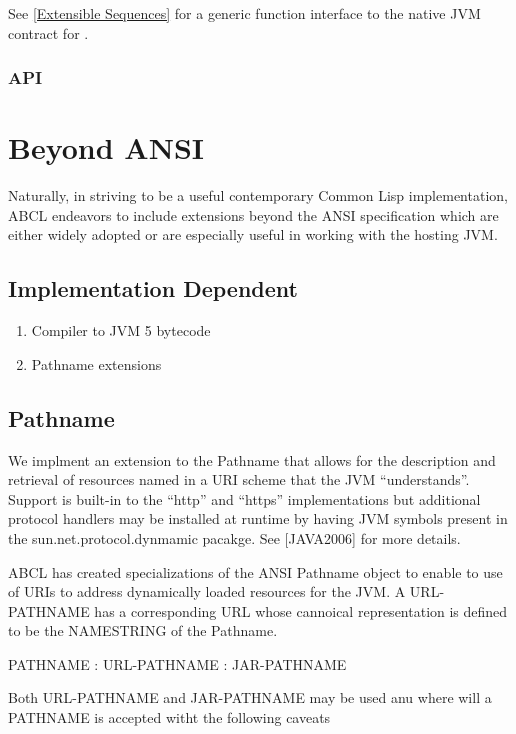 \documentclass[10pt]{book}
\begin{document}
See \ref{Extensible Sequences} for a generic function interface to
the native JVM contract for .

\subsection{API}



\chapter{Beyond ANSI}

Naturally, in striving to be a useful contemporary Common Lisp
implementation, ABCL endeavors to include extensions beyond the ANSI
specification which are either widely adopted or are especially useful
in working with the hosting JVM.

\section{Implementation Dependent}
\begin{enumerate}
  \item Compiler to JVM 5 bytecode
  \item Pathname extensions
\end{enumerate}

\section{Pathname}

We implment an extension to the Pathname that allows for the
description and retrieval of resources named in a URI scheme that the
JVM ``understands''.  Support is built-in to the ``http'' and
``https'' implementations but additional protocol handlers may be
installed at runtime by having JVM symbols present in the
sun.net.protocol.dynmamic pacakge. See [JAVA2006] for more details.

ABCL has created specializations of the ANSI Pathname object to
enable to use of URIs to address dynamically loaded resources for the
JVM.  A URL-PATHNAME has a corresponding URL whose cannoical
representation is defined to be the NAMESTRING of the Pathname.

PATHNAME : URL-PATHNAME : JAR-PATHNAME

Both URL-PATHNAME and JAR-PATHNAME may be used anu where will a
PATHNAME is accepted witht the following caveats
\end{document}
